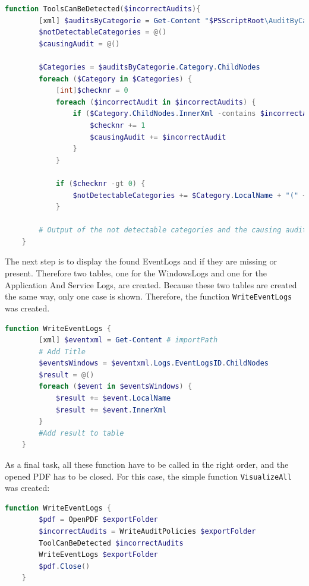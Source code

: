 \begin{lstlisting}[caption=Function ToolsCanBeDetected, language=PowerShell]
    function ToolsCanBeDetected($incorrectAudits){
        [xml] $auditsByCategorie = Get-Content "$PSScriptRoot\AuditByCategorie.xml"
        $notDetectableCategories = @()
        $causingAudit = @()

        $Categories = $auditsByCategorie.Category.ChildNodes
        foreach ($Category in $Categories) {
            [int]$checknr = 0
            foreach ($incorrectAudit in $incorrectAudits) {
                if ($Category.ChildNodes.InnerXml -contains $incorrectAudit) {
                    $checknr += 1
                    $causingAudit += $incorrectAudit
                }
            }
        
            if ($checknr -gt 0) {
                $notDetectableCategories += $Category.LocalName + "(" + $causingAudit + ")"
            }

        # Output of the not detectable categories and the causing audits    
    }
\end{lstlisting}
The next step is to display the found EventLogs and if they are missing or present. Therefore two tables, one for the WindowsLogs and one for the Application And Service Logs, are created. Because these two tables are created the same way, only one case is shown. Therefore, the function \lstinline|WriteEventLogs| was created.
\begin{lstlisting}[caption=Function ToolsCanBeDetected, language=PowerShell]
    function WriteEventLogs { 
        [xml] $eventxml = Get-Content # importPath
        # Add Title
        $eventsWindows = $eventxml.Logs.EventLogsID.ChildNodes
        $result = @()
        foreach ($event in $eventsWindows) {
            $result += $event.LocalName
            $result += $event.InnerXml
        }
        #Add result to table
    }
\end{lstlisting}
As a final task, all these function have to be called in the right order, and the opened PDF has to be closed. For this case, the simple function \lstinline|VisualizeAll| was created:
\begin{lstlisting}[caption=Function VisualizeAll, language=PowerShell]
    function WriteEventLogs { 
        $pdf = OpenPDF $exportFolder
        $incorrectAudits = WriteAuditPolicies $exportFolder
        ToolCanBeDetected $incorrectAudits
        WriteEventLogs $exportFolder
        $pdf.Close()
    }
\end{lstlisting}

